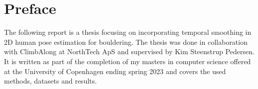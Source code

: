 \documentclass[./main.tex]{subfiles}
\begin{document}
\section*{Preface}
The following report is a thesis focusing on incorporating temporal smoothing in 2D human pose estimation for bouldering. The thesis was done in collaboration with ClimbAlong at NorthTech ApS and supervised by Kim Steenstrup Pedersen. It is written as part of the completion of my masters in computer science offered at the University of Copenhagen ending spring 2023 and covers the used methods, datasets and results.
\end{document}

